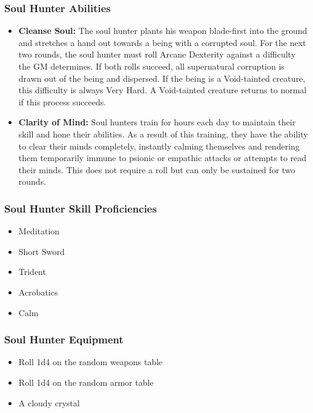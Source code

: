 \begin{multicols}{2}
\subsubsection{Soul Hunter Abilities}

\begin{itemize}
  \item \textbf{Cleanse Soul:} The soul hunter plants his weapon blade-first into
    the ground and stretches a hand out towards a being with a corrupted soul. For
    the next two rounds, the soul hunter must roll Arcane Dexterity against a difficulty
    the GM determines. If both rolls succeed, all supernatural corruption is drawn
    out of the being and dispersed. If the being is a Void-tainted creature, this
    difficulty is always Very Hard. A Void-tainted creature returns to normal if
    this process succeeds.
  \item \textbf{Clarity of Mind:} Soul hunters train for hours each day to maintain
    their skill and hone their abilities. As a result of this training, they have
    the ability to clear their minds completely, instantly calming themselves and rendering
    them temporarily immune to psionic or empathic attacks or attempts to read
    their minds. This does not require a roll but can only be sustained for two rounds.
\end{itemize}

\subsubsection{Soul Hunter Skill Proficiencies}

\begin{itemize}
  \item Meditation
  \item Short Sword
  \item Trident
  \item Acrobatics
  \item Calm
\end{itemize}

\subsubsection{Soul Hunter Equipment}

\begin{itemize}
  \item Roll 1d4 on the random weapons table
  \item Roll 1d4 on the random armor table
  \item A cloudy crystal
\end{itemize}


\end{multicols}
